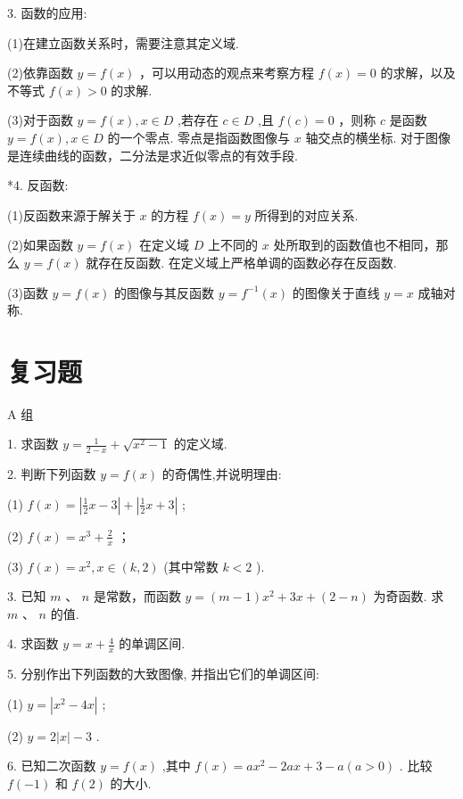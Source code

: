 \documentclass[10pt]{article}
\begin{document}
3. 函数的应用:

(1)在建立函数关系时，需要注意其定义域.

(2)依靠函数 \(y = f\left( x\right)\) ，可以用动态的观点来考察方程 \(f\left( x\right)  = 0\) 的求解，以及不等式 \(f\left( x\right)  > 0\) 的求解.

(3)对于函数 \(y = f\left( x\right) ,x \in  D\) ,若存在 \(c \in  D\) ,且 \(f\left( c\right)  = 0\) ，则称 \(c\) 是函数 \(y = f\left( x\right) ,x \in  D\) 的一个零点. 零点是指函数图像与 \(x\) 轴交点的横坐标. 对于图像是连续曲线的函数，二分法是求近似零点的有效手段.

*4. 反函数:

(1)反函数来源于解关于 \(x\) 的方程 \(f\left( x\right)  = y\) 所得到的对应关系.

(2)如果函数 \(y = f\left( x\right)\) 在定义域 \(D\) 上不同的 \(x\) 处所取到的函数值也不相同，那么 \(y = f\left( x\right)\) 就存在反函数. 在定义域上严格单调的函数必存在反函数.

(3)函数 \(y = f\left( x\right)\) 的图像与其反函数 \(y = {f}^{-1}\left( x\right)\) 的图像关于直线 \(y = x\) 成轴对称.

\section*{复习题}

A 组

1. 求函数 \(y = \frac{1}{2 - x} + \sqrt{{x}^{2} - 1}\) 的定义域.

2. 判断下列函数 \(y = f\left( x\right)\) 的奇偶性,并说明理由:

(1) \(f\left( x\right)  = \left| {\frac{1}{2}x - 3}\right|  + \left| {\frac{1}{2}x + 3}\right|\) ;

(2) \(f\left( x\right)  = {x}^{3} + \frac{2}{x}\) ；

(3) \(f\left( x\right)  = {x}^{2},x \in  \left( {k,2}\right)\) (其中常数 \(k < 2\) ).

3. 已知 \(m\text{ 、 }n\) 是常数，而函数 \(y = \left( {m - 1}\right) {x}^{2} + {3x} + \left( {2 - n}\right)\) 为奇函数. 求 \(m\text{ 、 }n\) 的值.

4. 求函数 \(y = x + \frac{4}{x}\) 的单调区间.

5. 分别作出下列函数的大致图像, 并指出它们的单调区间:

(1) \(y = \left| {{x}^{2} - {4x}}\right|\) ;

(2) \(y = 2\left| x\right|  - 3\) .

6. 已知二次函数 \(y = f\left( x\right)\) ,其中 \(f\left( x\right)  = a{x}^{2} - {2ax} + 3 - a\left( {a > 0}\right)\) . 比较 \(f\left( {-1}\right)\) 和 \(f\left( 2\right)\) 的大小.
\end{document}
